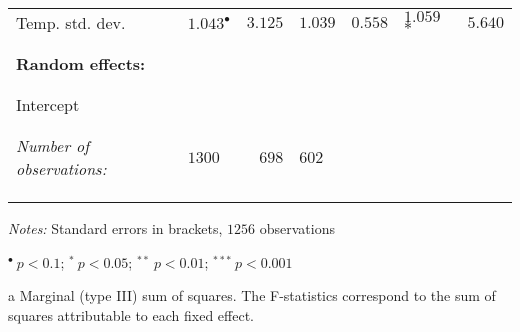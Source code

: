\documentclass[a4paper,12pt]{article}
\begin{document}
{\begin{threeparttable}
\begin{footnotesize}
\begin{tabular}{llrlllr}
          \vspace{-0.2cm}Temp. std. dev.&$1.043^{\bullet}$&$3.125$&$1.039$&$0.558$&$1.059$ ${*}$&$5.640$\\
  \\

  \hline
\vspace{-0.2cm} \\
  \multicolumn{1}{l}{\textbf{Random effects:}}  & \\
\vspace{-0.2cm}
\\
\hline
\\
  \vspace{-0.2cm}Intercept\\
 \\ 
 \hline
\vspace{-0.2cm} \\
\textit{Number of observations:}  &$1300$&$698$&$602$ \\
\vspace{-0.2cm}
\\  
  
  \hline
  \vspace{-0.2cm} \\

\hline
\vspace{-0.2cm}
\end{tabular} 
\end{footnotesize}
 \begin{tablenotes}
  \begin{footnotesize}
    \item \textit{Notes:} Standard errors in brackets, \hspace{0.05cm}$1256$ observations
        \begin{adjustwidth}{1cm}{} 
    \item \hspace{0.45cm}$^{\bullet}~p<0.1$; $^{*}~p<0.05$; $^{**}~p<0.01$; $^{***}~p<0.001$\\
    \item[a] Marginal (type III) sum of squares. The F-statistics correspond to the sum of squares attributable to each fixed effect.
     \end{adjustwidth}
\singlespacing
  \end{footnotesize}
\end{tablenotes}
  \end{threeparttable} 
\par}
\linespread{1}
\end{document}
